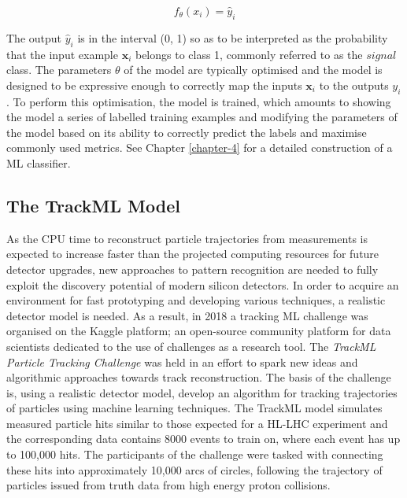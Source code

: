 \begin{equation}
    f_{\theta}(x_i) = \hat{y}_i
\end{equation}

The output $\hat{y}_i$ is in the interval (0, 1) so as to be interpreted as the probability that the input example $\textbf{x}_i$ belongs to class 1, commonly referred to as the $signal$ class. The parameters $\theta$ of the model are typically optimised and the model is designed to be expressive enough to correctly map the inputs $\textbf{x}_i$ to the outputs $y_i$. To perform this optimisation, the model is trained, which amounts to showing the model a series of labelled training examples and modifying the parameters of the model based on its ability to correctly predict the labels and maximise commonly used metrics. See Chapter \ref{chapter-4} for a detailed construction of a ML classifier.

\subsection{The TrackML Model}
\label{trackml-detector}

As the CPU time to reconstruct particle trajectories from measurements is expected to increase faster than the projected computing resources for future detector upgrades, new approaches to pattern recognition are needed to fully exploit the discovery potential of modern silicon detectors. In order to acquire an environment for fast prototyping and developing various techniques, a realistic detector model is needed. As a result, in 2018 a tracking ML challenge was organised on the Kaggle platform; an open-source community platform for data scientists dedicated to the use of challenges as a research tool. The \textit{TrackML Particle Tracking Challenge} \cite{kaggle-trackml} was held in an effort to spark new ideas and algorithmic approaches towards track reconstruction. The basis of the challenge is, using a realistic detector model, develop an algorithm for tracking trajectories of particles using machine learning techniques. The TrackML model simulates measured particle hits similar to those expected for a HL-LHC experiment and the corresponding data contains 8000 events to train on, where each event has up to 100,000 hits. The participants of the challenge were tasked with connecting these hits into approximately 10,000 arcs of circles, following the trajectory of particles issued from truth data from high energy proton collisions. 

